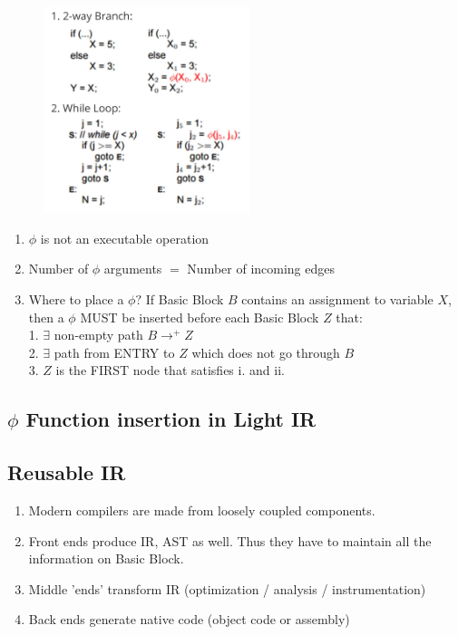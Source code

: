 \documentclass[a4paper]{exam}
\theoremstyle{definition}
\begin{document}
\begin{enumerate}
\begin{enumerate}
                \begin{figure}[htbp]
                  \centering
                  \includegraphics[width=6cm]{img/insert_phi.png}
                \end{figure}
                \begin{enumerate}
                  \item $\phi$ is not an executable operation
                  \item Number of $\phi$ arguments $=$ Number of incoming edges
                  \item Where to place a $\phi ?$ If Basic Block $B$ contains an assignment to variable $X$, then a $\phi$ MUST be inserted before each Basic Block $Z$ that:\\
                        1. $\exists$ non-empty path $B \rightarrow^{+} Z$\\
                        2. $\exists$ path from ENTRY to $Z$ which does not go through $B$\\
                        3. $Z$ is the FIRST node that satisfies $\mathrm{i}$. and ii.
                \end{enumerate}
        \end{enumerate}
\end{enumerate}
\subsection{$\phi$ Function insertion in Light IR}
\subsection{Reusable IR\cite{llvmintro}}
\begin{enumerate}
  \item Modern compilers are made from loosely coupled components.
  \item Front ends produce IR, AST as well. Thus they have to maintain all the information on Basic Block.
  \item Middle 'ends' transform IR (optimization / analysis / instrumentation)
  \item Back ends generate native code (object code or assembly)
\end{enumerate}
\end{document}
